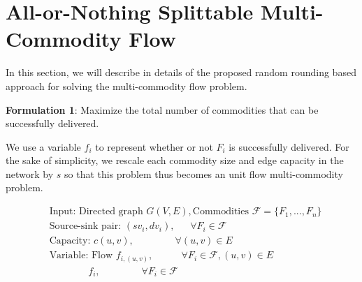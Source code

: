 \documentclass[conference]{IEEEtran}
\begin{document}
\section{All-or-Nothing Splittable Multi-Commodity Flow} \label{sec:proposed}
In this section, we will describe in details of the proposed random rounding based approach for solving the multi-commodity flow problem. 


\textbf{Formulation 1}: Maximize the total number of commodities that can be successfully delivered.

We use a variable $f_i$ to represent whether or not $F_i$ is successfully delivered. For the sake of simplicity, we rescale each commodity size and edge capacity in the network by $s$ so that this problem thus becomes an unit flow multi-commodity problem.


\begin{equation} \nonumber
\begin{aligned}
&\text{Input: Directed graph } G(V, E), \text{Commodities } \mathcal{F} = \{F_1, ..., F_n\} \\ \nonumber
&\text{Source-sink~pair: }(sv_i, dv_i),~~~~~~~ \forall F_i \in \mathcal{F} \\ \nonumber
&\text{Capacity: }c(u, v),~~~~~~~~~~~~~~~~~~~ \forall (u, v)\in E \\ \nonumber
&\text{Variable: Flow } f_{i, (u, v)},~~~~~~~~~~~~~ \forall F_i \in \mathcal{F}, (u, v) \in E \\ \nonumber
&~~~~~~~~~~~~~~~~~~f_i, ~~~~~~~~~~~~~~~~~~~\forall F_i \in \mathcal{F}  \nonumber
\end{aligned}
\end{equation}
\end{document}
